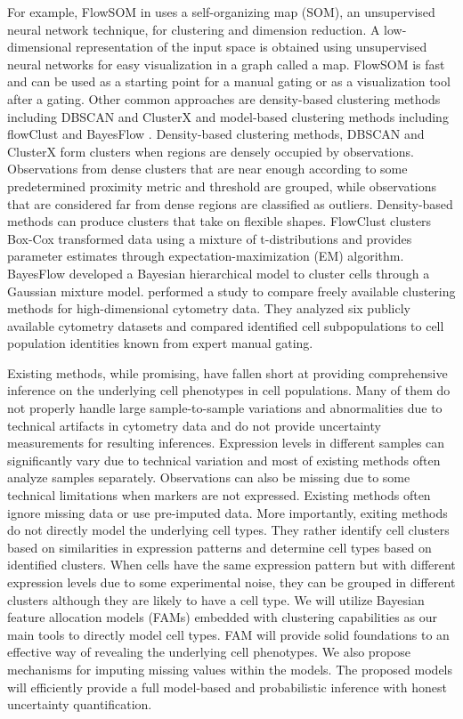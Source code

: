 \documentclass[12pt,]{article}
\begin{document}
For example, FlowSOM in \cite{van2015flowsom} uses a self-organizing map (SOM), an unsupervised neural network technique, for clustering and dimension reduction. A low-dimensional
representation of the input space is obtained using unsupervised neural networks for easy visualization in a graph called a map.  FlowSOM is fast and can be used as a starting point for a manual gating or as a visualization tool after a gating.
Other common approaches are density-based clustering methods including DBSCAN \citep{ester1996density} and ClusterX \citep{chen2016cytofkit} and  model-based clustering methods including flowClust \citep{lo2009flowclust} and BayesFlow \citep{johnsson2016bayesflow}.
Density-based clustering methods, DBSCAN and ClusterX form clusters when regions are densely occupied by
observations. Observations from dense clusters that are near enough according to
some predetermined proximity metric and threshold are grouped, while observations that are considered far from dense regions are classified as outliers. Density-based methods can produce clusters that take on flexible shapes. FlowClust clusters Box-Cox transformed data using a mixture of t-distributions and provides parameter estimates through expectation-maximization (EM) algorithm. BayesFlow developed a Bayesian hierarchical model to cluster cells through a Gaussian mixture model.  \cite{weber2016comparison} performed a study to compare freely available clustering methods for high-dimensional cytometry data.  They analyzed six publicly available cytometry datasets and compared identified cell subpopulations to cell population identities known from expert manual gating. 


Existing methods, while promising, have fallen short at providing comprehensive inference on the underlying cell phenotypes in cell populations.  Many of them do not properly handle large sample-to-sample variations and abnormalities due to technical artifacts in cytometry data and do not provide uncertainty measurements for resulting inferences.  Expression levels in different samples can significantly vary due to technical variation and most of existing methods often analyze samples separately.  Observations can also be missing due to some technical limitations when markers are not expressed.  Existing methods often ignore missing data or use pre-imputed data.  More importantly, exiting methods do not directly model the underlying cell types.  They rather identify cell clusters based on similarities in expression patterns and determine cell types based on identified clusters. When cells have the same expression pattern but with different expression levels due to some experimental noise, they can be grouped in different clusters although they are likely to have a cell type.  We will utilize Bayesian feature allocation models (FAMs) embedded with clustering
capabilities as our main tools to directly model cell types. FAM will provide solid foundations to an effective way of revealing the underlying cell phenotypes. We also propose mechanisms for imputing missing values within the
models. The proposed models will efficiently provide a full model-based and probabilistic inference with honest uncertainty quantification.
\end{document}
